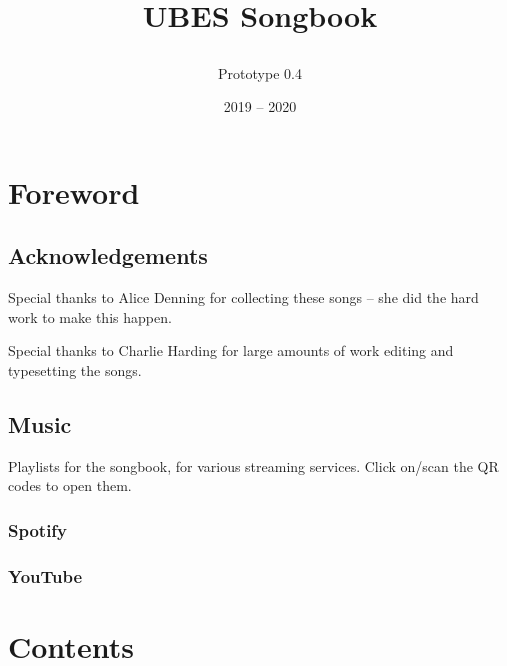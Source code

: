 \documentclass[9pt,twoside]{extarticle}
\title{
\centering
\def\svgwidth{0.4\textwidth}

\vspace{1in}
\\UBES Songbook}
\author{Prototype 0.4}
\date{2019 -- 2020}
\newcommand{\sectionbreak}{\clearpage}
\begin{document}
\raggedbottom
{}


\maketitle
\newpage

\section*{Foreword}

\subsection*{Acknowledgements}

\begin{center}
Special thanks to Alice Denning for collecting these songs -- she did the hard
work to make this happen.

Special thanks to Charlie Harding for large amounts of work editing and
typesetting the songs.
\end{center}

\subsection*{Music}
\begin{center}

Playlists for the songbook, for various streaming services. Click on/scan the QR codes to open them.

\subsubsection*{Spotify}
\quad
{}

\subsubsection*{YouTube}
\quad
{}


\end{center}
\newpage

\section*{Contents}
\renewcommand{\contentsname}{}
\tableofcontents

\sectionbreak
{}
\end{document}
